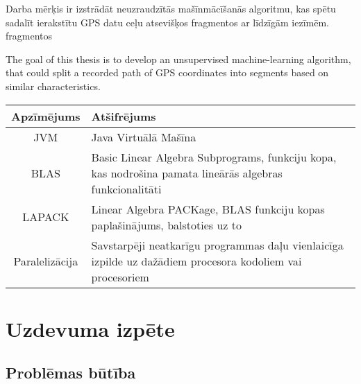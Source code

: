 \documentclass{ludis}
\begin{document}
\maketitle

\begin{abstract-lv}
  Darba mērķis ir izstrādāt neuzraudzītās mašīnmācīšanās algoritmu, kas spētu sadalīt ierakstītu
  GPS datu ceļu atsevišķos fragmentos ar līdzīgām iezīmēm.
fragmentos
\end{abstract-lv}

\begin{abstract-en}
  The goal of this thesis is to develop an unsupervised machine-learning algorithm, that could
  split a recorded path of GPS coordinates into segments based on similar characteristics.
\end{abstract-en}

\tableofcontents

\setlength\LTleft{0pt}
\setlength\LTright{0pt}
\begin{longtable}{| c | p{28em} |}
  \hline
  \textbf{Apzīmējums} & \textbf{Atšifrējums}\\ 
  \endhead
  \hline
  JVM & Java Virtuālā Mašīna\\
  BLAS & Basic Linear Algebra Subprograms, funkciju kopa, kas nodrošina pamata lineārās algebras 
  funkcionalitāti\\
  LAPACK & Linear Algebra PACKage, BLAS funkciju kopas paplašinājums, balstoties uz to\\
  Paralelizācija & Savstarpēji neatkarīgu programmas daļu vienlaicīga izpilde uz dažādiem procesora
  kodoliem vai procesoriem\\
  \hline
\end{longtable}



\chapter{Uzdevuma izpēte}
\section{Problēmas būtība}


\end{document}
